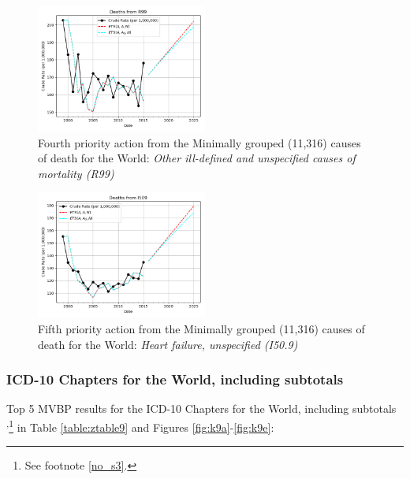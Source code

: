 \documentclass[10pt, a4paper, twocolumn]{IEEEconf}
\begin{document}
\begin{figure}[H]
  \centering
  \includegraphics[width=0.5\textwidth]{results/WORLD_ICD10_MINIMALLY_GROUPED/R99_ets.png}
  \caption{Fourth priority action from the Minimally grouped (11,316) causes of death for the World: \textit{Other ill-defined and unspecified causes of mortality (R99)}}\label{fig:k8d}
\end{figure}

\begin{figure}[H]
  \centering
  \includegraphics[width=0.5\textwidth]{results/WORLD_ICD10_MINIMALLY_GROUPED/I509_ets.png}
  \caption{Fifth priority action from the Minimally grouped (11,316) causes of death for the World: \textit{Heart failure, unspecified (I50.9)}}\label{fig:k8e}
\end{figure}

\clearpage

\subsubsection{ICD-10 Chapters for the World, including subtotals}

Top 5 MVBP results for the ICD-10 Chapters for the World, including subtotals \citep{whomortality}\textsuperscript{,}\footnote{See footnote \ref{no_s3}.} in Table \ref{table:ztable9} and Figures \ref{fig:k9a}-\ref{fig:k9e}:
\end{document}
